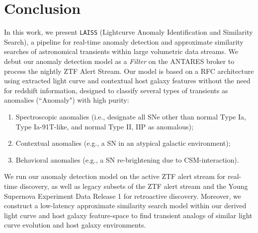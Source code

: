 \documentclass[twocolumn]{aastex63}
\newcommand{\laiss}{\texttt{LAISS}}
\begin{document}
\section{Conclusion} \label{sec:conclusion}

In this work, we present \laiss{} (Lightcurve Anomaly Identification and Similarity Search), a pipeline for real-time anomaly detection and approximate similarity searches of astronomical transients within large volumetric data streams. We debut our anomaly detection model as a \emph{Filter} on the ANTARES broker to process the nightly ZTF Alert Stream. Our model is based on a RFC architecture using extracted light curve and contextual host galaxy features without the need for redshift information, designed to classify several types of transients as anomalies (``Anomaly") with high purity: 
\begin{enumerate}
    \item Spectroscopic anomalies (i.e., designate all SNe other than normal Type Ia, Type Ia-91T-like, and normal Type II, IIP as anomalous); 
    \item Contextual anomalies (e.g., a SN in an atypical galactic environment);
    \item Behavioral anomalies (e.g., a SN re-brightening due to CSM-interaction).
\end{enumerate}
We run our anomaly detection model on the active ZTF alert stream for real-time discovery, as well as legacy subsets of the ZTF alert stream and the Young Supernova Experiment Data Release 1 for retroactive discovery. Moreover, we construct a low-latency approximate similarity search model within our derived light curve and host galaxy feature-space to find transient analogs of similar light curve evolution and host galaxy environments. \par
\end{document}
